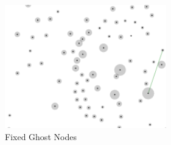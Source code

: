 \begin{figure}[h!]
  \begin{center}
  \includegraphics[trim={0, 0, 0, 0}, width=70mm]{./Figures/greyCircles.png}
  \caption{Fixed Ghost Nodes}
  \label{fig:greyCircles}
  \end{center}
\end{figure}



